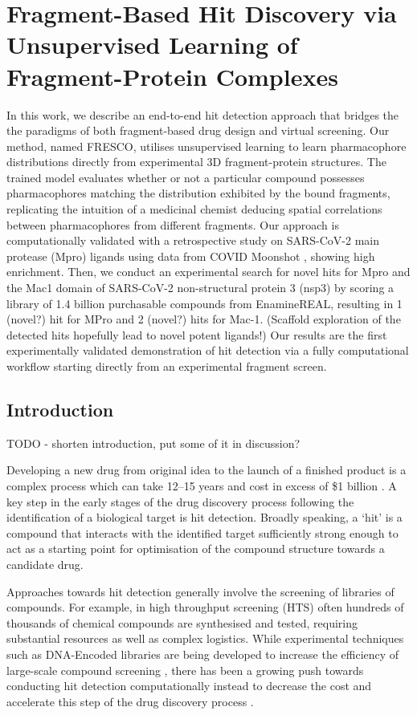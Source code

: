 
\chapter{Fragment-Based Hit Discovery via Unsupervised Learning of Fragment-Protein Complexes}
In this work, we describe an end-to-end hit detection approach that bridges the the paradigms of both fragment-based drug design and virtual screening. Our method, named FRESCO, utilises unsupervised learning to learn pharmacophore distributions directly from experimental 3D fragment-protein structures. The trained model evaluates whether or not a particular compound possesses pharmacophores matching the distribution exhibited by the bound fragments, replicating the intuition of a medicinal chemist deducing spatial correlations between pharmacophores from different fragments. Our approach is computationally validated with a retrospective study on SARS-CoV-2 main protease (Mpro) ligands using data from COVID Moonshot \cite{Moonshot2022}, showing high enrichment. Then, we conduct an experimental search for novel hits for Mpro and the Mac1 domain of SARS-CoV-2 non-structural protein 3 (nsp3) by scoring a library of 1.4 billion purchasable compounds from EnamineREAL, resulting in 1 (novel?) hit for MPro and 2 (novel?) hits for Mac-1. (Scaffold exploration of the detected hits hopefully lead to novel potent ligands!) Our results are the first experimentally validated demonstration of hit detection via a fully computational workflow starting directly from an experimental fragment screen.

\section{Introduction}

TODO - shorten introduction, put some of it in discussion?

Developing a new drug from original idea to the launch of a finished product is a complex process which can take 12–15 years and cost in excess of \$1 billion \cite{Hughes2011Principles}. A key step in the early stages of the drug discovery process following the identification of a biological target is hit detection. Broadly speaking, a `hit' is a compound that interacts with the identified target sufficiently strong enough to act as a starting point for optimisation of the compound structure towards a candidate drug. 

Approaches towards hit detection generally involve the screening of libraries of compounds. For example, in high throughput screening (HTS) often hundreds of thousands of chemical compounds are synthesised and tested, requiring substantial resources as well as complex logistics. While experimental techniques such as DNA-Encoded libraries are being developed to increase the efficiency of large-scale compound screening \cite{GirondaMartinez2021DNALibrary}, there has been a growing push towards conducting hit detection computationally instead to decrease the cost and accelerate this step of the drug discovery process \cite{?}. 

